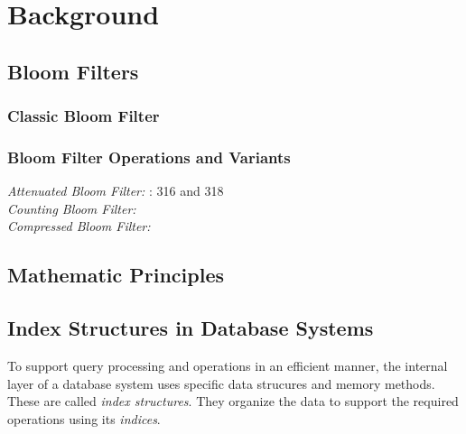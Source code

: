 \chapter{Background}\label{ch:background}
\section{Bloom Filters}\label{sec:bloom}
\subsection{Classic Bloom Filter}\label{subsec:classic_bloom}
\cite{Bloom1970}
\subsection{Bloom Filter Operations and Variants}\label{subsec:bloom_ops}
\textit{Attenuated Bloom Filter:} \cite{Sakuma2011}: 316 and 318\\
\textit{Counting Bloom Filter:} \cite{Fan2000}\\
\textit{Compressed Bloom Filter:} \cite{Mitzenmacher2002}
\section{Mathematic Principles}\label{sec:math}
\section{Index Structures in Database Systems}\label{sec:index_structures}
To support query processing and operations in an efficient manner, the internal layer of a database system uses specific data strucures and memory methods. These are called \textit{index structures}. They organize the data to support the required operations using its \textit{indices}.

